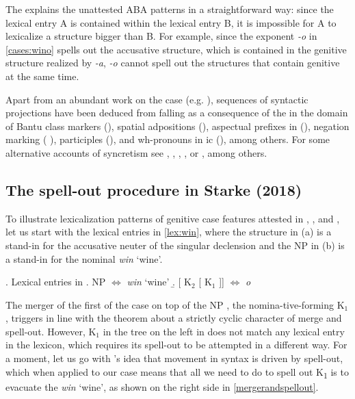 \noindent
The  explains the unattested ABA patterns in a straightforward way: since the lexical entry A is contained within the lexical entry B, it is impossible for A to lexicalize a structure bigger than B. For example, since the exponent \textit{-o} in \ref{cases:wino} spells out the accusative structure, which is contained in the genitive structure realized by \textit{-a}, \textit{-o} cannot  spell out the structures that contain genitive at the same time. 
\par 
Apart from an abundant work on the case  (e.g. \citealt{Caha2009,Zompi2017,Starke2017}), sequences of syntactic projections have been deduced from  falling as a consequence of the  in the domain of Bantu class markers (\citealt{Taraldsen2010}), spatial adpositions (\citealt{Pantcheva2011}), aspectual prefixes in  (\citealt{Wiland2012}), negation marking (\citeauthor{DeC2013} \citeyear{DeC2013,DeC2018}), participles (\citealt{Starke2006,LTN}), and wh-pronouns in ic (\citealt{Vangsnes2013}), among others. For some alternative accounts of syncretism see \cite{Stump2001}, \cite{Baerman2005}, \cite{Burzio2007}, \cite{Muller2008}, or \cite{Bobaljik2012}, among others. 

\subsection{The spell-out procedure in Starke (2018)}\label{sec:Starke2018}

  To illustrate lexicalization patterns of genitive case features attested in , , and , let us start with the lexical entries in \ref{lex:win}, where the structure in (a) is a stand-in for the  accusative neuter of the singular declension and the NP in (b) is a stand-in for the nominal  \textit{win} `wine'.

\ex. Lexical entries in \label{lex:win}
\a. NP $\Leftrightarrow$ \textit{win} `wine'
\b. [ K$_{2}$ [ K$_{1}$ ]] $\Leftrightarrow$ \textit{o}\label{intro:o}

\noindent
The merger of the first  of the case  on top of the NP , the nomina-tive-forming K$_{1}$, triggers  in line with the theorem about a strictly cyclic character of merge and spell-out. However, K$_{1}$ in the tree on the left in \Next does not match any lexical entry in the  lexicon, which requires its spell-out to be attempted in a different way. For a moment, let us go  with \citeauthor{Caha2011}'s \citeyearpar{Caha2011} idea that movement in syntax is driven by spell-out, which when applied to our case means that all we need to do to spell out K\textsubscript{1} is to evacuate the  \textit{win} `wine', as shown on the right side in \ref{mergerandspellout}. 

